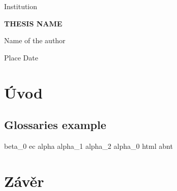 \documentclass{proc-cz}
\begin{document}
\begin{titlepage}
\begin{center}


\large
Institution
\vspace{2.8cm}

\Large
\textbf{THESIS NAME}


\vspace{5.5cm}
\Large
Name of the author

\vspace{0.8cm}
Place Date 


\end{center}
\end{titlepage}



%
%


\pagestyle{plainstyle}
\newpage
\tableofcontents
\newpage
\printunsrtglossary[type=gls_entry]
\newpage
\pagestyle{myfancy}

\section{Úvod}
\lipsum[1] %


\subsection{Glossaries example}
\lipsum[2] %
\gls{beta_0}
\gls{ec}
\gls{alpha}
\gls{alpha_1}
\gls{alpha_2}
\gls{alpha_0}
\gls{html}
\gls{abnt}

\newpage

\section{Závěr}
\lipsum[3] %
\newpage
\printbibliography[title={Použitá literatura}]
\end{document}
